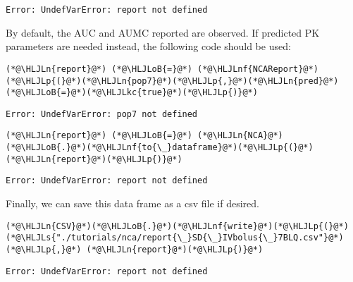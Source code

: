 \documentclass[12pt,a4paper]{article}
\newcommand{\HLJLkc}[1]{\textcolor[RGB]{59,151,46}{\textit{#1}}}
\newcommand{\HLJLn}[1]{#1}
\newcommand{\HLJLnf}[1]{\textcolor[RGB]{66,102,213}{#1}}
\newcommand{\HLJLs}[1]{\textcolor[RGB]{201,61,57}{#1}}
\newcommand{\HLJLoB}[1]{\textcolor[RGB]{102,102,102}{\textbf{#1}}}
\newcommand{\HLJLp}[1]{#1}
\begin{document}
\begin{lstlisting}
Error: UndefVarError: report not defined
\end{lstlisting}


By default, the AUC and AUMC reported are observed. If predicted PK parameters are needed instead, the following code should be used:


\begin{lstlisting}
(*@\HLJLn{report}@*) (*@\HLJLoB{=}@*) (*@\HLJLnf{NCAReport}@*)(*@\HLJLp{(}@*)(*@\HLJLn{pop7}@*)(*@\HLJLp{,}@*)(*@\HLJLn{pred}@*)(*@\HLJLoB{=}@*)(*@\HLJLkc{true}@*)(*@\HLJLp{)}@*)
\end{lstlisting}

\begin{lstlisting}
Error: UndefVarError: pop7 not defined
\end{lstlisting}


\begin{lstlisting}
(*@\HLJLn{report}@*) (*@\HLJLoB{=}@*) (*@\HLJLn{NCA}@*)(*@\HLJLoB{.}@*)(*@\HLJLnf{to{\_}dataframe}@*)(*@\HLJLp{(}@*)(*@\HLJLn{report}@*)(*@\HLJLp{)}@*)
\end{lstlisting}

\begin{lstlisting}
Error: UndefVarError: report not defined
\end{lstlisting}


Finally, we can save this data frame as a csv file if desired.


\begin{lstlisting}
(*@\HLJLn{CSV}@*)(*@\HLJLoB{.}@*)(*@\HLJLnf{write}@*)(*@\HLJLp{(}@*)(*@\HLJLs{"./tutorials/nca/report{\_}SD{\_}IVbolus{\_}7BLQ.csv"}@*)(*@\HLJLp{,}@*) (*@\HLJLn{report}@*)(*@\HLJLp{)}@*)
\end{lstlisting}

\begin{lstlisting}
Error: UndefVarError: report not defined
\end{lstlisting}
\end{document}
